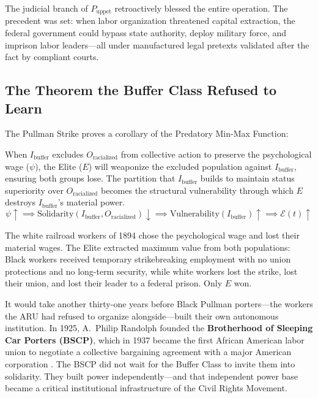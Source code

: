 \documentclass[12pt,openany]{book}
\begin{document}
The judicial branch of $P_{\text{uppet}}$ retroactively blessed the entire operation. The precedent was set: when labor organization threatened capital extraction, the federal government could bypass state authority, deploy military force, and imprison labor leaders---all under manufactured legal pretexts validated after the fact by compliant courts.

\subsection{The Theorem the Buffer Class Refused to Learn}

The Pullman Strike proves a corollary of the Predatory Min-Max Function:

\begin{keyinsight}
When $I_{\text{buffer}}$ excludes $O_{\text{racialized}}$ from collective action to preserve the psychological wage ($\psi$), the Elite ($E$) will weaponize the excluded population against $I_{\text{buffer}}$, ensuring both groups lose. The partition that $I_{\text{buffer}}$ builds to maintain status superiority over $O_{\text{racialized}}$ becomes the structural vulnerability through which $E$ destroys $I_{\text{buffer}}$'s material power.
\[
\psi \uparrow \implies \text{Solidarity}(I_{\text{buffer}}, O_{\text{racialized}}) \downarrow \implies \text{Vulnerability}(I_{\text{buffer}}) \uparrow \implies \mathcal{E}(t) \uparrow
\]
\end{keyinsight}

The white railroad workers of 1894 chose the psychological wage and lost their material wages. The Elite extracted maximum value from both populations: Black workers received temporary strikebreaking employment with no union protections and no long-term security, while white workers lost the strike, lost their union, and lost their leader to a federal prison. Only $E$ won.

It would take another thirty-one years before Black Pullman porters---the workers the ARU had refused to organize alongside---built their own autonomous institution. In 1925, A.\ Philip Randolph founded the \textbf{Brotherhood of Sleeping Car Porters (BSCP)}, which in 1937 became the first African American labor union to negotiate a collective bargaining agreement with a major American corporation \cite{bates_pullman}. The BSCP did not wait for the Buffer Class to invite them into solidarity. They built power independently---and that independent power base became a critical institutional infrastructure of the Civil Rights Movement.
\end{document}
